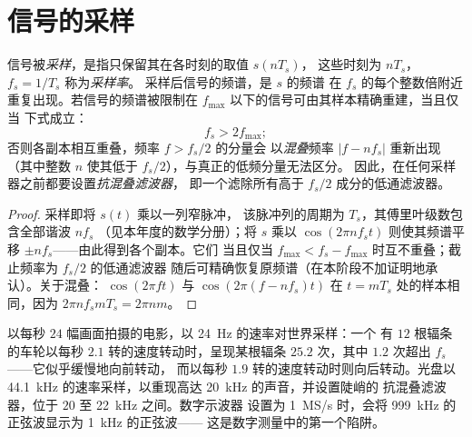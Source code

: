 \section{信号的采样}

\begin{theorem}\label{thm:b2:feedback-oscillators:shannon}
信号被\emph{采样}，是指只保留其在各时刻的取值 $s(nT_s)$，
这些时刻为 $nT_s$，$f_s = 1/T_s$ 称为\emph{采样率}。
采样后信号的频谱，是 $s$ 的频谱
在 $f_s$ 的每个整数倍附近重复出现。若信号的频谱被限制在
$f_{\max}$ 以下的信号可由其样本精确重建，当且仅当
下式成立：
\[
f_s > 2f_{\max} ;
\]
否则各副本相互重叠，频率 $f > f_s/2$ 的分量会
以\emph{混叠}频率 $|f - nf_s|$ 重新出现（其中整数 $n$
使其低于 $f_s/2$），与真正的低频分量无法区分。
因此，在任何采样器之前都要设置\emph{抗混叠滤波器}，
即一个滤除所有高于 $f_s/2$ 成分的低通滤波器。
\end{theorem}

\begin{proof}
采样即将 $s(t)$ 乘以一列窄脉冲，
该脉冲列的周期为 $T_s$，其傅里叶级数包含全部谐波 $nf_s$
（见本年度的数学分册）；将 $s$ 乘以 $\cos(2\pi nf_st)$
则使其频谱平移 $\pm nf_s$——由此得到各个副本。它们
当且仅当 $f_{\max} < f_s - f_{\max}$ 时互不重叠；截止频率为 $f_s/2$ 的低通滤波器
随后可精确恢复原频谱（在本阶段不加证明地承认）。关于混叠：
$\cos(2\pi ft)$ 与 $\cos(2\pi(f - nf_s)t)$ 在 $t = mT_s$
处的样本相同，因为 $2\pi nf_smT_s = 2\pi nm$。
\end{proof}

\begin{example}[车轮、光盘与示波器]\label{ex:b2:feedback-oscillators:alias}
以每秒 $24$ 幅画面拍摄的电影，以 \qty{24}{Hz} 的速率对世界采样：一个
有 $12$ 根辐条的车轮以每秒 $2.1$ 转的速度转动时，呈现某根辐条
$25.2$ 次，其中 $1.2$ 次超出 $f_s$——它似乎缓慢地向前转动，
而以每秒 $1.9$ 转的速度转动时则向后转动。光盘以
\qty{44.1}{kHz} 的速率采样，以重现高达 \qty{20}{kHz} 的声音，并设置陡峭的
抗混叠滤波器，位于 $20$ 至 \qty{22}{kHz} 之间。数字示波器
设置为 \qty{1}{MS/s} 时，会将 \qty{999}{kHz} 的正弦波显示为 \qty{1}{kHz} 的正弦波——
这是数字测量中的第一个陷阱。
\end{example}

